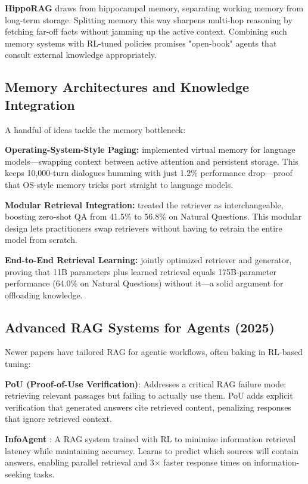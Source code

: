 \documentclass[12pt,a4paper]{report}
\theoremstyle{definition}
\begin{document}
\textbf{HippoRAG} \cite{gutierrez2024hipporag} draws from hippocampal memory, separating working memory from long-term storage. Splitting memory this way sharpens multi-hop reasoning by fetching far-off facts without jamming up the active context. Combining such memory systems with RL-tuned policies promises "open-book" agents that consult external knowledge appropriately.

\subsection{Memory Architectures and Knowledge Integration}
\label{sec:memory}

A handful of ideas tackle the memory bottleneck:

\textbf{Operating-System-Style Paging:} \citet{packer2023memgpt} implemented virtual memory for language models---swapping context between active attention and persistent storage. This keeps 10,000-turn dialogues humming with just 1.2\% performance drop---proof that OS-style memory tricks port straight to language models.

\textbf{Modular Retrieval Integration:} \citet{shi2023replug} treated the retriever as interchangeable, boosting zero-shot QA from 41.5\% to 56.8\% on Natural Questions. This modular design lets practitioners swap retrievers without having to retrain the entire model from scratch.

\textbf{End-to-End Retrieval Learning:} \citet{izacard2022atlas} jointly optimized retriever and generator, proving that 11B parameters plus learned retrieval equals 175B-parameter performance (64.0\% on Natural Questions) without it---a solid argument for offloading knowledge.

\subsection{Advanced RAG Systems for Agents (2025)}
\label{sec:rag_2025}

Newer papers have tailored RAG for agentic workflows, often baking in RL-based tuning:

\textbf{PoU (Proof-of-Use Verification)}: Addresses a critical RAG failure mode: retrieving relevant passages but failing to actually use them. PoU adds explicit verification that generated answers cite retrieved content, penalizing responses that ignore retrieved context.

\textbf{InfoAgent} \cite{zhang2025infoagent}: A RAG system trained with RL to minimize information retrieval latency while maintaining accuracy. Learns to predict which sources will contain answers, enabling parallel retrieval and 3$\times$ faster response times on information-seeking tasks.
\end{document}

